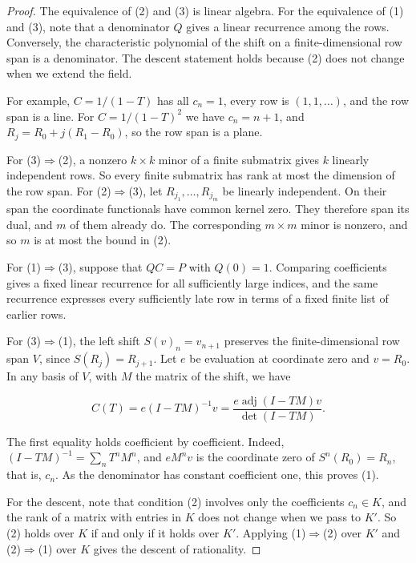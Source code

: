 \documentclass[11pt]{article}
\begin{document}
\begin{proof}[{Proof}]\label{bp13}%
The equivalence of (2) and (3) is linear algebra. For the equivalence of (1) and (3), note that a denominator \(Q\) gives a linear recurrence among the rows. Conversely, the characteristic polynomial of the shift on a finite-dimensional row span is a denominator. The descent statement holds because (2) does not change when we extend the field.

For example, \(C=1/(1-T)\) has all \(c_n=1\), every row is \((1,1,\ldots)\), and the row span is a line. For \(C=1/(1-T)^2\) we have \(c_n=n+1\), and \(R_j=R_0+j(R_1-R_0)\), so the row span is a plane.

For (3)\(\Rightarrow\)(2), a nonzero \(k\times k\) minor of a finite submatrix gives \(k\) linearly independent rows. So every finite submatrix has rank at most the dimension of the row span. For (2)\(\Rightarrow\)(3), let \(R_{j_1},\ldots,R_{j_m}\) be linearly independent. On their span the coordinate functionals have common kernel zero. They therefore span its dual, and \(m\) of them already do. The corresponding \(m\times m\) minor is nonzero, and so \(m\) is at most the bound in (2).

For (1)\(\Rightarrow\)(3), suppose that \(QC=P\) with \(Q(0)=1\). Comparing coefficients gives a fixed linear recurrence for all sufficiently large indices, and the same recurrence expresses every sufficiently late row in terms of a fixed finite list of earlier rows.

For (3)\(\Rightarrow\)(1), the left shift \(S(v)_n=v_{n+1}\) preserves the finite-dimensional row span \(V\), since \(S(R_j)=R_{j+1}\). Let \(e\) be evaluation at coordinate zero and \(v=R_0\). In any basis of \(V\), with \(M\) the matrix of the shift, we have

\[
C(T)=e(I-TM)^{-1}v
=\frac{e\operatorname{adj}(I-TM)v}{\det(I-TM)}.
\]

The first equality holds coefficient by coefficient. Indeed, \((I-TM)^{-1}=\sum_nT^nM^n\), and \(eM^nv\) is the coordinate zero of \(S^n(R_0)=R_n\), that is, \(c_n\). As the denominator has constant coefficient one, this proves (1).

For the descent, note that condition (2) involves only the coefficients \(c_n\in K\), and the rank of a matrix with entries in \(K\) does not change when we pass to \(K'\). So (2) holds over \(K\) if and only if it holds over \(K'\). Applying (1)\(\Rightarrow\)(2) over \(K'\) and (2)\(\Rightarrow\)(1) over \(K\) gives the descent of rationality.
\end{proof}
\end{document}
